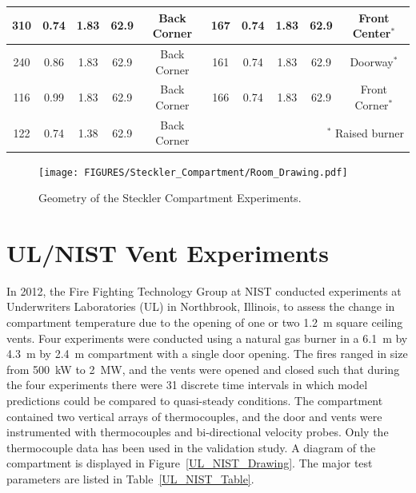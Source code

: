 \begin{table}[h!]
\begin{center}
\begin{tabular}{|c|c|c|c|c||c|c|c|c|c|}
310     & 0.74      & 1.83          &  62.9      & Back Corner  & 167   & 0.74      & 1.83        &  62.9         & Front Center$^*$    \\ \hline
240     & 0.86      & 1.83          &  62.9      & Back Corner  & 161   & 0.74      & 1.83        &  62.9         & Doorway$^*$         \\ \hline
116     & 0.99      & 1.83          &  62.9      & Back Corner  & 166   & 0.74      & 1.83        &  62.9         & Front Corner$^*$    \\ \hline
122     & 0.74      & 1.38          &  62.9      & Back Corner  &  \multicolumn{5}{r|}{$^*$ Raised burner}                   \\ \hline
\end{tabular}
\end{center}
\label{Steckler_Table}
\end{table}


\begin{figure}[ht]
\begin{center}
\texttt{[image: FIGURES/Steckler\_Compartment/Room\_Drawing.pdf]}
\end{center}
\caption{Geometry of the Steckler Compartment Experiments.}
\label{Steckler_ Drawing}
\end{figure}


\clearpage

\section{UL/NIST Vent Experiments}
\label{UL_NIST_Vents_Description}

In 2012, the Fire Fighting Technology Group at NIST conducted experiments at Underwriters Laboratories (UL) in Northbrook, Illinois, to assess the change in compartment temperature due to the opening of one or two 1.2~m square ceiling vents. Four experiments were conducted using a natural gas burner in a 6.1~m by 4.3~m by 2.4~m compartment with a single door opening. The fires ranged in size from 500~kW to 2~MW, and the vents were opened and closed such that during the four experiments there were 31 discrete time intervals in which model predictions could be compared to quasi-steady conditions. The compartment contained two vertical arrays of thermocouples, and the door and vents were instrumented with thermocouples and bi-directional velocity probes. Only the thermocouple data has been used in the validation study. A diagram of the compartment is displayed in Figure~\ref{UL_NIST_Drawing}. The major test parameters are listed in Table~\ref{UL_NIST_Table}.

